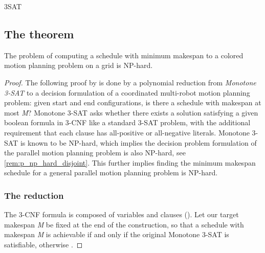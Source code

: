 



\begin{definition}
	3SAT
\end{definition}

\subsection{The theorem}

\begin{theorem}
	The problem of computing a schedule with minimum makespan to a colored motion planning problem on a grid is NP-hard.
\end{theorem}

\begin{proof}
	The following proof by \cite{siamcomp/DemaineFKMS19} is done by a polynomial reduction from \emph{Monotone 3-SAT} to a decision formulation of a coordinated multi-robot motion planning problem: given start and end configurations, is there a schedule with makespan at most \emph{M}? Monotone 3-SAT asks whether there exists a solution satisfying a given boolean formula \ilmath{\varphi} in 3-CNF like a standard 3-SAT problem, with the additional requirement that each clause has all-positive or all-negative literals. Monotone 3-SAT is known to be NP-hard, which implies the decision problem formulation of the parallel motion planning problem is also NP-hard, see \cref{rem:p_np_hard_disjoint}. This further implies finding the minimum makespan schedule for a general parallel motion planning problem is NP-hard.

	\subsubsection*{The reduction} 
	The 3-CNF formula \ilmath{\varphi} is composed of  variables  and  clauses (). Let our target makespan \emph{M} be fixed at the end of the construction, so that a schedule with makespan \emph{M} is achievable if and only if the original Monotone 3-SAT is satisfiable, otherwise .
\end{proof}

